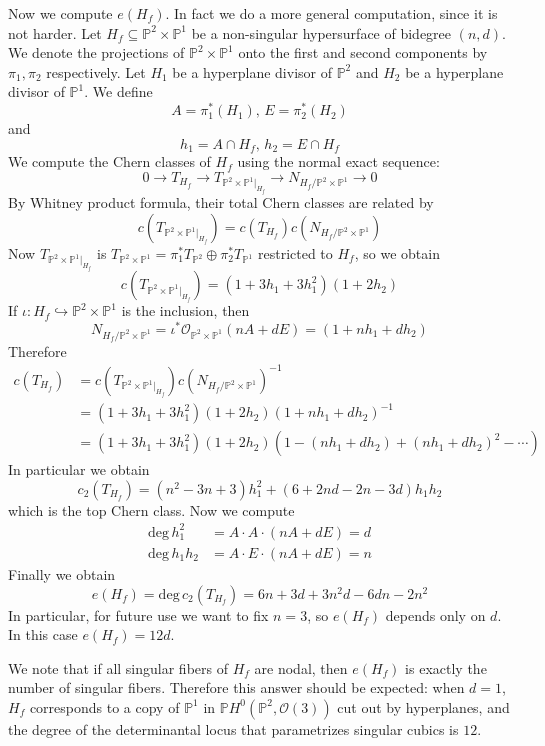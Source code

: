 \documentclass[12pt]{article}
\theoremstyle{plain}
\theoremstyle{definition}
\newcommand{\IP}{\mathbb{P}}
\newcommand{\sO}{\mathcal{O}}
\renewcommand{\deg}{\mathrm{deg}\,}
\newcommand{\<}{\langle}
\renewcommand{\>}{\rangle}
\newcommand{\into}{\hookrightarrow}
\begin{document}
Now we compute $e(H_f)$. In fact we do a more general computation, since it is not harder. Let $H_f \subseteq \IP^2 \times \IP^1$ be a non-singular hypersurface of bidegree $(n, d)$. We denote the projections of $\IP^2 \times \IP^1$ onto the first and second components by $\pi_1, \pi_2$ respectively. Let $H_1$ be a hyperplane divisor of $\IP^2$ and $H_2$ be a hyperplane divisor of $\IP^1$. We define 
$$ A = \pi_1^*(H_1), \, E = \pi_2^*(H_2) $$
and $$ h_1 = A \cap H_f, \, h_2 = E \cap H_f $$
We compute the Chern classes of $H_f$ using the normal exact sequence:
$$ 0 \to T_{H_f} \to T_{\IP^2 \times \IP^1|_{H_f}} \to N_{H_f/\IP^2 \times \IP^1} \to 0$$
By Whitney product formula, their total Chern classes are related by
$$ c(T_{\IP^2 \times \IP^1|_{H_f}}) = c(T_{H_f}) c(N_{H_f/\IP^2 \times \IP^1}) $$
Now $T_{\IP^2 \times \IP^1|_{H_f}}$ is $T_{\IP^2 \times \IP^1} = \pi_1^* T_{\IP^2} \oplus \pi_2^* T_{\IP^1}$ restricted to $H_f$, so we obtain 
$$ c(T_{\IP^2 \times \IP^1|_{H_f}}) = (1 + 3h_1 + 3h_1^2)(1 + 2h_2) $$
If $\iota : H_f \into \IP^2 \times \IP^1$ is the inclusion, then $$N_{H_f/\IP^2 \times \IP^1} = \iota^* \sO_{\IP^2 \times \IP^1}(nA  + dE) = (1 + nh_1 + dh_2)$$
Therefore 
\begin{align*}
c(T_{H_f}) &= c(T_{\IP^2 \times \IP^1|_{H_f}})c(N_{H_f/\IP^2 \times \IP^1})^{-1}\\
&= (1 + 3h_1 + 3h_1^2)(1 + 2h_2)(1 + nh_1 + dh_2)^{-1}\\
&= (1 + 3h_1 + 3h_1^2)(1 + 2h_2)(1 - (nh_1 + dh_2) + (nh_1 + dh_2)^2 - \cdots)
\end{align*}
In particular we obtain 
$$ c_2(T_{H_f}) = (n^2 - 3n + 3)h_1^2 + (6 + 2nd - 2n - 3d)h_1 h_2 $$
which is the top Chern class. Now we compute 
\begin{align*}
\deg h_1^2 &= A \cdot A \cdot (nA + dE) = d \\
\deg h_1 h_2 &= A \cdot E \cdot (nA + dE) = n 
\end{align*}
Finally we obtain 
$$ e(H_f) = \deg c_2(T_{H_f}) = 6n + 3d + 3n^2 d - 6 dn - 2n^2 $$
In particular, for future use we want to fix $n = 3$, so $e(H_f)$ depends only on $d$. In this case $e(H_f) = 12 d$. 

We note that if all singular fibers of $H_f$ are nodal, then $e(H_f)$ is exactly the number of singular fibers. Therefore this answer should be expected: when $d = 1$, $H_f$ corresponds to a copy of $\IP^1$ in $\IP H^0(\IP^2, \sO(3))$ cut out by hyperplanes, and the degree of the determinantal locus that parametrizes singular cubics is $12$.  
\end{document}

